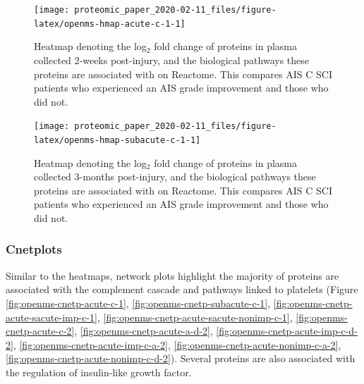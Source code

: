 \documentclass[9pt,lineno]{elife}
\begin{document}
\begin{landscape}



\begin{figure}

{\centering \texttt{[image: proteomic\_paper\_2020-02-11\_files/figure-latex/openms-hmap-acute-c-1-1]} 

}

\caption{Heatmap denoting the log\(_2\) fold change of proteins in plasma collected 2-weeks post-injury, and the biological pathways these proteins are associated with on Reactome. This compares AIS C SCI patients who experienced an AIS grade improvement and those who did not.}\label{fig:openms-hmap-acute-c-1}
\end{figure}

\end{landscape}
\begin{landscape}



\begin{figure}

{\centering \texttt{[image: proteomic\_paper\_2020-02-11\_files/figure-latex/openms-hmap-subacute-c-1-1]} 

}

\caption{Heatmap denoting the log\(_2\) fold change of proteins in plasma collected 3-months post-injury, and the biological pathways these proteins are associated with on Reactome. This compares AIS C SCI patients who experienced an AIS grade improvement and those who did not.}\label{fig:openms-hmap-subacute-c-1}
\end{figure}

\end{landscape}
\clearpage

\hypertarget{cnetplot-chap3}{%
\subsubsection{Cnetplots}\label{cnetplot-chap3}}

Similar to the heatmaps, network plots highlight the majority of proteins are associated with the complement cascade and pathways linked to platelets (Figure \ref{fig:openms-cnetp-acute-c-1}, \ref{fig:openms-cnetp-subacute-c-1}, \ref{fig:openms-cnetp-acute-sacute-imp-c-1}, \ref{fig:openms-cnetp-acute-sacute-nonimp-c-1}, \ref{fig:openms-cnetp-acute-c-2}, \ref{fig:openms-cnetp-acute-a-d-2}, \ref{fig:openms-cnetp-acute-imp-c-d-2}, \ref{fig:openms-cnetp-acute-imp-c-a-2}, \ref{fig:openms-cnetp-acute-nonimp-c-a-2}, \ref{fig:openms-cnetp-acute-nonimp-c-d-2}).
Several proteins are also associated with the regulation of insulin-like growth factor.
\end{document}
